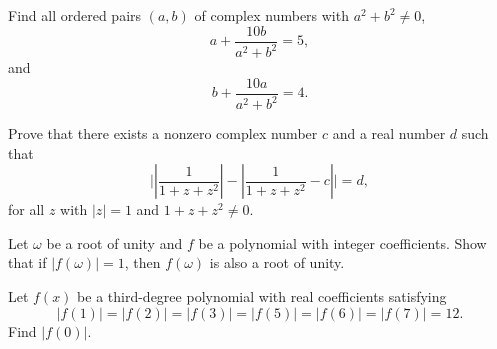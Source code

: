 \documentclass[11pt]{article}
\theoremstyle{definition}
\begin{document}
\begin{question}[name={2014 HMMT, Guts, \href{https://artofproblemsolving.com/community/c129h603993p3586761}{Problem 32}}]
	Find all ordered pairs $(a,b)$ of complex numbers with $a^2+b^2\neq 0$, $$a+\frac{10b}{a^2+b^2}=5,$$ and $$b+\frac{10a}{a^2+b^2}=4.$$
\end{question}




%	







\begin{question}[name={2014 HMMT, Team, \href{https://artofproblemsolving.com/community/c129h578709p3414337}{Problem 5}}]
	Prove that there exists a nonzero complex number $c$ and a real number $d$ such that\[\Bigg|\left|\dfrac1{1+z+z^2}\right|-\left|\dfrac1{1+z+z^2}-c\right|\Bigg|=d,\]for all $z$ with $|z|=1$ and $1+z+z^2\neq 0$.
\end{question}




%	







\begin{question}[name={2014 HMIC, \href{https://artofproblemsolving.com/community/c129h1359782p7448398}{Problem 4}}]
	Let $\omega$ be a root of unity and $f$ be a polynomial with integer coefficients. Show that if $|f(\omega)|=1$, then $f(\omega)$ is also a root of unity.
\end{question}




%	




\begin{question}[name={2015 AIME I, \href{https://artofproblemsolving.com/community/c4p4622257}{Problem 10}}]
	Let $f(x)$ be a third-degree polynomial with real coefficients satisfying
	\[|f(1)|=|f(2)|=|f(3)|=|f(5)|=|f(6)|=|f(7)|=12.\]Find $|f(0)|$.
\end{question}
\end{document}
